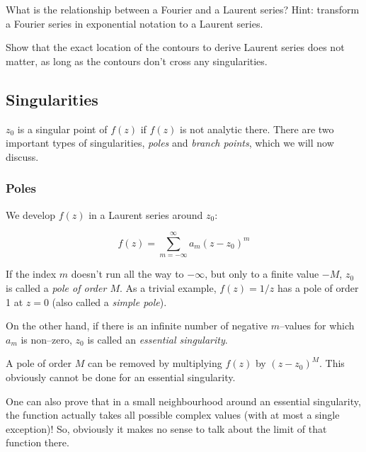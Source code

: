 \begin{sidebar}
\begin{ex}
What is the relationship between a Fourier and a Laurent series? Hint: transform a Fourier series in exponential notation to a Laurent series.
\end{ex}
\end{sidebar}

\begin{sidebar}
\begin{ex}
Show that the exact location of the contours to derive Laurent series does not matter, as long as the contours don't cross any singularities.
\end{ex}
\end{sidebar}


\subsection{Singularities}

$z_0$ is a singular point of $f(z)$ if $f(z)$ is not analytic there. There are
two important types of singularities, \emph{poles} and \emph{branch points},
which we will now discuss.

\subsubsection*{Poles}

We develop $f(z)$ in a Laurent series around $z_0$:

\begin{equation}
f(z)= \sum_{m=-\infty}^{\infty} a_m (z-z_0)^m
\end{equation} 

If the index $m$ doesn't run all the way to $-\infty$, but only to a finite
value $-M$, $z_0$ is called a \emph{pole of order $M$}. As a trivial example,
$f(z)=1/z$ has a pole of order 1 at $z=0$ (also called a \emph{simple pole}).

On the other hand, if there is an infinite number of negative $m$--values for
which $a_m$ is non--zero, $z_0$ is called an \emph{essential singularity}.

A pole of order $M$ can be removed by multiplying $f(z)$ by $(z-z_0)^M$. This
obviously cannot be done for an essential singularity.

One can also prove that in a small neighbourhood around an essential singularity, the
function actually takes all possible complex values (with at most a single exception)! So, obviously it makes no sense
to talk about the limit of that function there.

